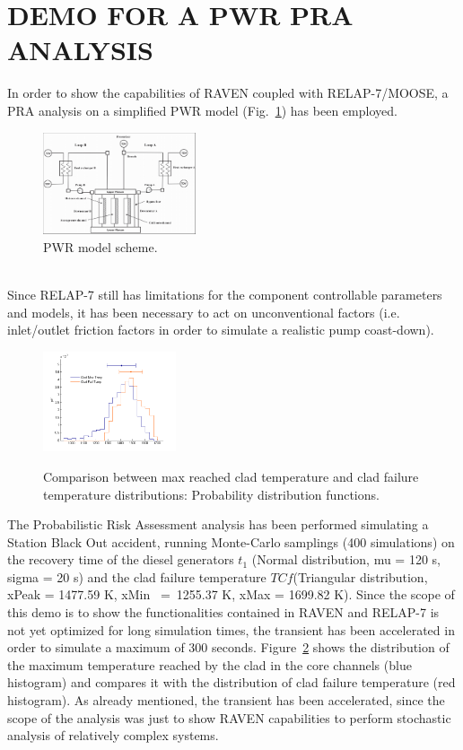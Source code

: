 \documentclass{anstrans}
\begin{document}
\section{DEMO FOR A PWR PRA ANALYSIS}
In order to show the capabilities of RAVEN coupled with RELAP-7/MOOSE, a PRA analysis on a simplified PWR model (Fig.~\ref{fig:PWRmodel}) has been employed. 
\begin{figure}
   \centering
    \includegraphics[width=0.4\textwidth]{figures/PWR_TMI_SCHEME.PNG}
    \caption{PWR model scheme.}
    \label{fig:PWRmodel}
\end{figure}
\\Since RELAP-7 still has limitations for the component controllable parameters and models, it has been necessary to act on unconventional factors (i.e. inlet/outlet friction factors in order to simulate a realistic pump coast-down).
\begin{figure} [H]
\centering
  \centering
  \includegraphics[width=0.35\textwidth]{figures/PRA_dist2.png}
  \label{fig:pdf_temp}
   \caption{Comparison between max reached clad temperature and clad failure temperature distributions: Probability distribution functions.}
\label{fig:distributionResults}
\end{figure}

The Probabilistic Risk Assessment analysis has been performed simulating a Station Black Out accident, running Monte-Carlo samplings (400 simulations) on the recovery time of the diesel generators $t_{1}$ (Normal distribution, mu = 120 s, sigma = 20 s) and the clad failure temperature $TC{f}$(Triangular distribution, xPeak = 1477.59 K, xMin~ =~1255.37 K, xMax = 1699.82 K). Since the scope of this demo is to show the functionalities contained in RAVEN and RELAP-7 is not yet optimized for long simulation times, the transient has been accelerated in order to simulate a maximum of 300 seconds. 
Figure~\ref{fig:distributionResults} shows the distribution of the maximum temperature reached by the clad in the core channels (blue histogram) and compares it with the distribution of clad failure temperature (red histogram).
As already mentioned, the transient has been accelerated, since the scope of the analysis was just to show RAVEN capabilities to perform stochastic analysis of relatively complex systems. %
\end{document}
